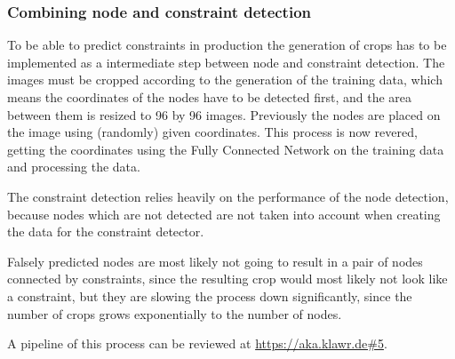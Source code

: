 \subsubsection{Combining node and constraint detection}

To be able to predict constraints in production the generation of crops has to be implemented as a intermediate step between node and constraint detection.
The images must be cropped according to the generation of the training data, which means the coordinates of the nodes have to be detected first, and the area between them is resized to 96 by 96 images.
Previously the nodes are placed on the image using (randomly) given coordinates.
This process is now revered, getting the coordinates using the Fully Connected Network on the training data and processing the data.

The constraint detection relies heavily on the performance of the node detection, because nodes which are not detected are not taken into account when creating the data for the constraint detector.

Falsely predicted nodes are most likely not going to result in a pair of nodes connected by constraints, since the resulting crop would most likely not look like a constraint, but they are slowing the process down significantly, since the number of crops grows exponentially to the number of nodes.

A pipeline of this process can be reviewed at \url{https://aka.klawr.de\#5}.

